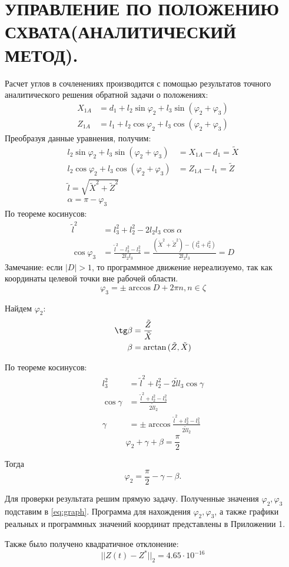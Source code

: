 \chapter{\MakeUppercase{Управление по положению схвата(аналитический метод). }}

Расчет углов в сочленениях производится с помощью результатов точного аналитического решения обратной задачи о положениях:
\begin{align*}
    X_{1A}&=d_1+l_2\sin\varphi_2+l_3\sin{(\varphi_2+\varphi_3)} \\
   Z_{1A}&=l_1+l_2\cos\varphi_2+l_3\cos{(\varphi_2+\varphi_3)} \label{eq:graph} \tag{1}
\end{align*}
Преобразуя данные уравнения, получим:
\begin{align*}
    l_2\sin\varphi_2+l_3\sin{(\varphi_2+\varphi_3)}&=X_{1A}-d_1=\tilde X \\
   l_2\cos\varphi_2+l_3\cos{(\varphi_2+\varphi_3)}&=Z_{1A}-l_1=\tilde Z \\
   \tilde l=\sqrt{\tilde X^2+\tilde Z^2} \\
   \alpha=\pi-\varphi_3
\end{align*}
По теореме косинусов:
\begin{align*}
    \tilde l^2 &= l_3^2+l_2^2-2 l_2 l_3 \cos\alpha\\ 
     \cos\varphi_3 &= \frac{\tilde l^2-l_3^2-l_2^2}{2l_2l_3}=\frac{(\tilde X^2+\tilde Z^2)-(l_3^2+l_2^2)}{2l_2l_3}=D
\end{align*}
Замечание: если $|D|>1$, то программное движение нереализуемо, так как координаты целевой точки вне рабочей области.
$$\varphi_3=\pm \arccos{D+2\pi n}, n\in\zeta$$

Найдем $\varphi_2$:
\begin{align*}
\tg\beta&=\frac{\tilde Z}{\tilde X} \\
\beta&=\arctan{(\tilde Z,\tilde X)}
\end{align*}

По теореме косинусов:
\begin{align*}
    l_3^2 &= \tilde l^2+l_2^2-2\tilde l l_3 \cos\gamma \\
    \cos\gamma &= \frac{\tilde l^2+l_2^2-l_3^2}{2\tilde l l_2} \\
    \gamma &=\pm \arccos\frac{\tilde l^2+l_2^2-l_3^2}{2\tilde l l_2}
\end{align*}
$$\varphi_2+\gamma+\beta=\frac\pi 2$$ 

Тогда $$\varphi_2=\frac \pi 2 -\gamma-\beta.$$

Для проверки результата решим прямую задачу. Полученные значения $\varphi_2,\varphi_3$ подставим в \eqref{eq:graph}. Программа для нахождения $\varphi_2,\varphi_3$, а также графики реальных и программных значений координат представлены в Приложении 1.

Также было получено квадратичное отклонение: $$||Z(t)-Z^*||_2=4.65\cdot10^{-16}$$
